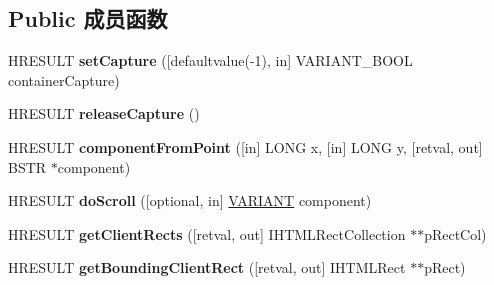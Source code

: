 \subsection*{Public 成员函数}
\begin{DoxyCompactItemize}
\item 
\mbox{\label{interface_m_s_h_t_m_l_1_1_i_h_t_m_l_element2_a54bfc5250a6c6ad6eae2914b0872cd27}} 
H\+R\+E\+S\+U\+LT {\bfseries set\+Capture} (\mbox{[}defaultvalue(-\/1), in\mbox{]} V\+A\+R\+I\+A\+N\+T\+\_\+\+B\+O\+OL container\+Capture)
\item 
\mbox{\label{interface_m_s_h_t_m_l_1_1_i_h_t_m_l_element2_a4ab9613604ae57663f9dbf69b007b481}} 
H\+R\+E\+S\+U\+LT {\bfseries release\+Capture} ()
\item 
\mbox{\label{interface_m_s_h_t_m_l_1_1_i_h_t_m_l_element2_a2a47c28556499a4120bc3a04d4870910}} 
H\+R\+E\+S\+U\+LT {\bfseries component\+From\+Point} (\mbox{[}in\mbox{]} L\+O\+NG x, \mbox{[}in\mbox{]} L\+O\+NG y, \mbox{[}retval, out\mbox{]} B\+S\+TR $\ast$component)
\item 
\mbox{\label{interface_m_s_h_t_m_l_1_1_i_h_t_m_l_element2_a7d830bf5cb92aa14009648f8be5686b0}} 
H\+R\+E\+S\+U\+LT {\bfseries do\+Scroll} (\mbox{[}optional, in\mbox{]} \hyperlink{structtag_v_a_r_i_a_n_t}{V\+A\+R\+I\+A\+NT} component)
\item 
\mbox{\label{interface_m_s_h_t_m_l_1_1_i_h_t_m_l_element2_add2f0a756d47cf1daacd42fe6b884761}} 
H\+R\+E\+S\+U\+LT {\bfseries get\+Client\+Rects} (\mbox{[}retval, out\mbox{]} I\+H\+T\+M\+L\+Rect\+Collection $\ast$$\ast$p\+Rect\+Col)
\item 
\mbox{\label{interface_m_s_h_t_m_l_1_1_i_h_t_m_l_element2_a0b685cf5694cde97ec14c6a07a4c53ea}} 
H\+R\+E\+S\+U\+LT {\bfseries get\+Bounding\+Client\+Rect} (\mbox{[}retval, out\mbox{]} I\+H\+T\+M\+L\+Rect $\ast$$\ast$p\+Rect)
\item 
\mbox{\label{interface_m_s_h_t_m_l_1_1_i_h_t_m_l_element2_ac8c1680acd0b27574fd76604b040d8d2}} 

\end{DoxyCompactItemize}
